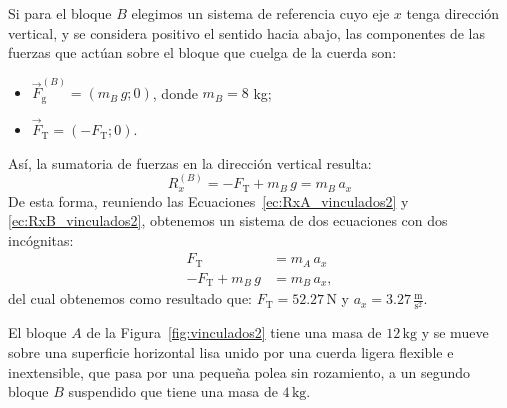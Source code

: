 \documentclass[addpoints]{exam}
\newcommand{\un}[1]{\text{#1}}
\begin{document}
\begin{questions}
\begin{solution}
        Si para el bloque $B$ elegimos un sistema de referencia cuyo eje $x$ tenga dirección vertical, y se considera positivo el sentido hacia abajo, las componentes de las fuerzas que actúan sobre el bloque que cuelga de la cuerda son:
        \begin{itemize}
            \item $\vec{F}_\text{g}^{(B)} = \left( m_B \, g; 0\right)$, donde $m_B = 8$ kg;
            \item $\vec{F}_\text{T} = (-F_\text{T};0)$.
        \end{itemize}
        Así, la sumatoria de fuerzas en la dirección vertical resulta: 
        \begin{equation}
            \label{ec:RxB_vinculados2}
            R_x^{(B)} =  - F_\text{T} + m_B \, g = m_B \, a_x
        \end{equation} De esta forma, reuniendo las Ecuaciones~\eqref{ec:RxA_vinculados2} y \eqref{ec:RxB_vinculados2}, obtenemos un sistema de dos ecuaciones con dos incógnitas:
        \begin{align*}
                    F_\text{T} &= m_A \, a_x \\
            - F_\text{T} + m_B \, g &= m_B \, a_x,
        \end{align*} del cual obtenemos como resultado que: $F_\text{T} = 52.27 \, \text{N}$ y $a_x = 3.27 \, \frac{\text{m}}{\text{s}^2}$.
    \end{solution}

    \question El bloque $A$ de la Figura~\ref{fig:vinculados2} tiene una masa de $12 \, \un{kg}$ y se mueve sobre una superficie horizontal lisa unido por una cuerda ligera flexible e inextensible, que pasa por una pequeña polea sin rozamiento, a un segundo bloque $B$ suspendido que tiene una masa de $4 \, \un{kg}$.



\end{questions}
\end{document}
